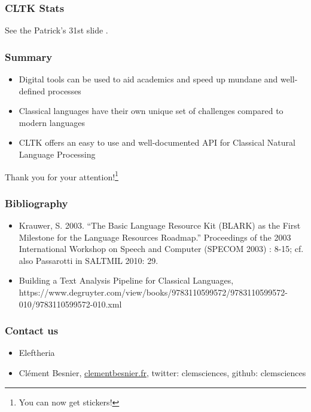\documentclass{beamer}
\begin{document}
\begin{frame}
\frametitle{CLTK Stats}

See the Patrick's 31st slide .
\end{frame}



\begin{frame}
\frametitle{Summary}
\begin{itemize}
    \item Digital tools can be used to aid academics and speed up mundane and well-defined processes
    \item Classical languages have their own unique set of challenges compared to modern languages
    \item CLTK offers an easy to use and well-documented API for Classical Natural Language Processing
\end{itemize}
\end{frame}


\begin{frame}
\begin{center}
    Thank you for your attention!\footnote{{You can now get stickers! \footnotesize}}
\end{center}




\end{frame}


\begin{frame}

\frametitle{Bibliography}
\begin{itemize}
    \item \label{paper:krauwer2003} Krauwer, S. 2003. “The Basic Language Resource Kit (BLARK) as the First Milestone for the Language Resources Roadmap.” Proceedings of the 2003 International Workshop on Speech and Computer (SPECOM 2003) : 8-15; cf. also Passarotti in SALTMIL 2010: 29.
    \item \label{paper:burns2019} Building a Text Analysis Pipeline for Classical Languages, https://www.degruyter.com/view/books/9783110599572/9783110599572-010/9783110599572-010.xml
\end{itemize}{}


\end{frame}


\begin{frame}
\frametitle{Contact us}

\begin{itemize}
\item Eleftheria

\item Clément Besnier, \href{https://www.clementbesnier.fr}{clementbesnier.fr}, twitter: clemsciences, github: clemsciences
\end{itemize}

\end{frame}
\end{document}
